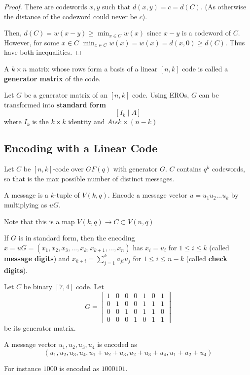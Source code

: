 \documentclass{article}
\begin{document}
\begin{proof}
  There are codewords \( x, y \) such that \( d(x, y) = c = d(C) \).
  (As otherwise the distance of the codeword could never be \( c \)).

  Then, \( d(C) = w(x - y) \ge \min_{x \in C}w(x) \) since \( x-y  \)
  is a codeword of \( C \). However, for some \( x \in C \)  \(
  \min_{x \in C}w(x) = w(x) = d(x, 0) \ge d(C)\). Thus have both inequalities.
\end{proof}
\begin{definition}
  A \( k \times n \) matrix whose rows form a basis of a linear \(
  [n, k] \) code is called a \textbf{generator matrix} of the code.
\end{definition}
\begin{theorem}
  Let \( G \) be a generator matrix of an \( [n, k] \) code. Using
  EROs, \( G \) can be transformed into \textbf{standard form} \[
    [I_k \mid A]
  \] where \( I_k \) is the \( k \times k  \) identity and \( A is k
  \times (n-k) \)
\end{theorem}
\subsection{Encoding with a Linear Code}
\begin{definition}
  Let \( C \) be \( [n, k] \)-code over \( GF(q) \) with generator \(
  G \). \( C \) contains \( q^k \) codewords, so that is the max
  possible number of distinct messages.

  A message is a \( k \)-tuple of \( V(k, q) \). Encode a message
  vector \( u = u_1 u_2 \dots u_k  \) by multiplying as \( uG \).

  Note that this is a map \( V(k, q) \to C \subset V(n, q) \)
\end{definition}
\begin{corollary}
  If \( G \) is in standard form, then the encoding \( x = uG = (x_1,
  x_2, x_3 ,\dots, x_k, x_{k+1}, \dots, x_n)  \) has \( x_i = u_i \)
  for \( 1 \le i \le k \) (called \textbf{message digits}) and \(
  x_{k+i} = \sum_{j=1}^k a_{ji}u_j\) for \( 1 \le i \le  n-k \)
  (called \textbf{check digits}).
\end{corollary}
\begin{example}
  Let \( C \) be binary \( [7, 4] \) code. Let \[
    G =
    \begin{bmatrix}
      1 & 0 & 0 & 0 & 1 & 0 & 1 \\
      0 & 1 & 0 & 0 & 1 & 1 & 1 \\
      0 & 0 & 1 & 0 & 1 & 1 & 0 \\
      0 & 0 & 0 & 1 & 0 & 1 & 1
    \end{bmatrix}
  \] be its generator matrix.

  A message vector \( u_1, u_2, u_3, u_4 \) is encoded as \[
    (u_1, u_2, u_3, u_4, u_1 + u_2 + u_3, u_2 + u_3 + u_4, u_1 + u_2 + u_4)
  \]

  For instance \( 1000 \) is encoded as \( 1000101 \).
\end{example}
\end{document}
